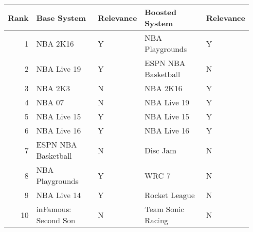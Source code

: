 \begin{tabular}{rllll}
\toprule
Rank & Base System & Relevance & Boosted System & Relevance \\
\midrule
1 & NBA 2K16 & Y & NBA Playgrounds & Y \\
2 & NBA Live 19 & Y & ESPN NBA Basketball & N \\
3 & NBA 2K3 & N & NBA 2K16 & Y \\
4 & NBA 07 & N & NBA Live 19 & Y \\
5 & NBA Live 15 & Y & NBA Live 15 & Y \\
6 & NBA Live 16 & Y & NBA Live 16 & Y \\
7 & ESPN NBA Basketball & N & Disc Jam & N \\
8 & NBA Playgrounds & Y & WRC 7 & N \\
9 & NBA Live 14 & Y & Rocket League & N \\
10 & inFamous: Second Son & N & Team Sonic Racing & N \\
\bottomrule
\end{tabular}
